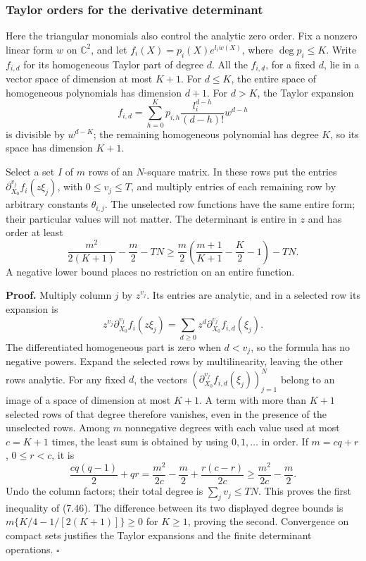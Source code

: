 \documentclass[
  11pt,
  a4paper,
]{article}
\begin{document}
\subsubsection{Taylor orders for the derivative
determinant}\label{taylor-orders-for-the-derivative-determinant}

Here the triangular monomials also control the analytic zero order. Fix
a nonzero linear form \(w\) on \(\mathbb C^2\), and let
\(f_i(X)=p_i(X)e^{l_iw(X)}\), where \(\deg p_i\le K\). Write \(f_{i,d}\)
for its homogeneous Taylor part of degree \(d\). All the \(f_{i,d}\),
for a fixed \(d\), lie in a vector space of dimension at most \(K+1\).
For \(d\le K\), the entire space of homogeneous polynomials has
dimension \(d+1\). For \(d>K\), the Taylor expansion \[
f_{i,d}=\sum_{h=0}^K p_{i,h}\frac{l_i^{d-h}}{(d-h)!}w^{d-h}
\] is divisible by \(w^{d-K}\); the remaining homogeneous polynomial has
degree \(K\), so its space has dimension \(K+1\).

Select a set \(I\) of \(m\) rows of an \(N\)-square matrix. In these
rows put the entries \(\partial_{X_0}^{v_j}f_i(z\xi_j)\), with
\(0\le v_j\le T\), and multiply entries of each remaining row by
arbitrary constants \(\theta_{i,j}\). The unselected row functions have
the same entire form; their particular values will not matter. The
determinant is entire in \(z\) and has order at least \[
\frac{m^2}{2(K+1)}-\frac m2-TN
\ge\frac m2\left(\frac{m+1}{K+1}-\frac K2-1\right)-TN.
\tag{7.46}
\] A negative lower bound places no restriction on an entire function.

\textbf{Proof.} Multiply column \(j\) by \(z^{v_j}\). Its entries are
analytic, and in a selected row its expansion is \[
z^{v_j}\partial_{X_0}^{v_j}f_i(z\xi_j)
=\sum_{d\ge0}z^d\partial_{X_0}^{v_j}f_{i,d}(\xi_j).
\] The differentiated homogeneous part is zero when \(d<v_j\), so the
formula has no negative powers. Expand the selected rows by
multilinearity, leaving the other rows analytic. For any fixed \(d\),
the vectors \((\partial_{X_0}^{v_j}f_{i,d}(\xi_j))_{j=1}^N\) belong to
an image of a space of dimension at most \(K+1\). A term with more than
\(K+1\) selected rows of that degree therefore vanishes, even in the
presence of the unselected rows. Among \(m\) nonnegative degrees with
each value used at most \(c=K+1\) times, the least sum is obtained by
using \(0,1,\ldots\) in order. If \(m=cq+r\), \(0\le r<c\), it is \[
\frac{cq(q-1)}2+qr
=\frac{m^2}{2c}-\frac m2+\frac{r(c-r)}{2c}
\ge\frac{m^2}{2c}-\frac m2.
\] Undo the column factors; their total degree is \(\sum_jv_j\le TN\).
This proves the first inequality of (7.46). The difference between its
two displayed degree bounds is \(m\{K/4-1/[2(K+1)]\}\ge0\) for
\(K\ge1\), proving the second. Convergence on compact sets justifies the
Taylor expansions and the finite determinant operations. \(\square\)
\end{document}
